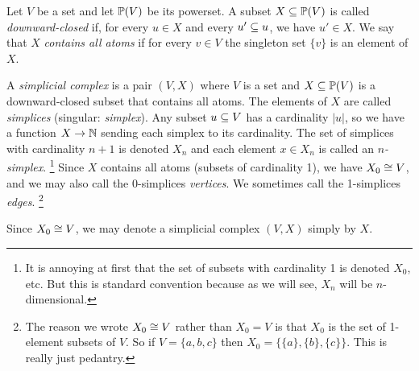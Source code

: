\documentclass[CT4S-EN-RU]{subfiles}
\begin{document}
\begin{definitionENG}\label{def:simplicial complex}
Let $V$ be a set and let $\PP(V)$ be its powerset. A subset $X\ss\PP(V)$ is called {\em downward-closed} if, for every $u\in X$ and every $u'\ss u$, we have $u'\in X$. We say that $X$ {\em contains all atoms} if for every $v\in V$ the singleton set $\{v\}$ is an element of $X$. 

A {\em simplicial complex} is a pair $(V,X)$ where $V$ is a set and $X\ss\PP(V)$ is a downward-closed subset that contains all atoms. The elements of $X$ are called {\em simplices} (singular: {\em simplex}). Any subset $u\ss V$ has a cardinality $|u|$, so we have a function $X\to\NN$ sending each simplex to its cardinality. The set of simplices with cardinality $n+1$ is denoted $X_n$ and each element $x\in X_n$ is called an {\em $n$-simplex}.%
\footnote{It is annoying at first that the set of subsets with cardinality 1 is denoted $X_0$, etc. But this is standard convention because as we will see, $X_n$ will be $n$-dimensional.}
Since $X$ contains all atoms (subsets of cardinality 1), we have $X_0\iso V$, and we may also call the 0-simplices {\em vertices}. We sometimes call the 1-simplices {\em edges}.%
\footnote{The reason we wrote $X_0\iso V$ rather than $X_0=V$ is that $X_0$ is the set of 1-element subsets of $V$. So if $V=\{a,b,c\}$ then $X_0=\{\{a\},\{b\},\{c\}\}$. This is really just pedantry.}

Since $X_0\iso V$, we may denote a simplicial complex $(V,X)$ simply by $X$.
\end{definitionENG}
\end{document}
